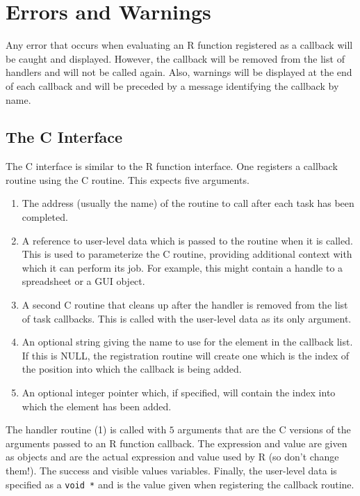 \documentclass{article}
\begin{document}
\section{Errors and Warnings}
Any error that occurs when evaluating an R function registered as a
callback will be caught and displayed. However, the callback will be
removed from the list of handlers and will not be called again.  Also,
warnings will be displayed at the end of each callback and will be
preceded by a message identifying the callback by name.


\subsection{The C Interface}
The C interface is similar to the R function interface.  One registers
a callback routine using the  C routine.
This expects five arguments.
\begin{enumerate}
\item The address (usually the name) of the routine to call after each
  task has been completed.
\item A reference to user-level data which is passed to the routine
  when it is called.  This is used to parameterize the C routine,
  providing additional context with which it can perform its 
  job. For example, this might contain a handle to 
  a spreadsheet or a GUI object.
\item A second C routine that cleans up after the handler is removed
  from the list of task callbacks. This is called with the user-level
  data as its only argument.
\item An optional string giving the name to use for the element in the
  callback list. If this is NULL, the registration routine
  will create one which is the index of the position into which the
  callback is being added.
\item An optional integer pointer which, if specified,
     will contain the index into which the element
     has been added.
\end{enumerate}

The handler routine (1) is called with $5$ arguments that are the C
versions of the arguments passed to an R function callback.  The
expression and value are given as  objects and are the
actual expression and value used by R (so don't change them!).  The
success and visible values  variables.  Finally, the
user-level data is specified as a \verb+void *+ and is the value given
when registering the callback routine.
\end{document}
